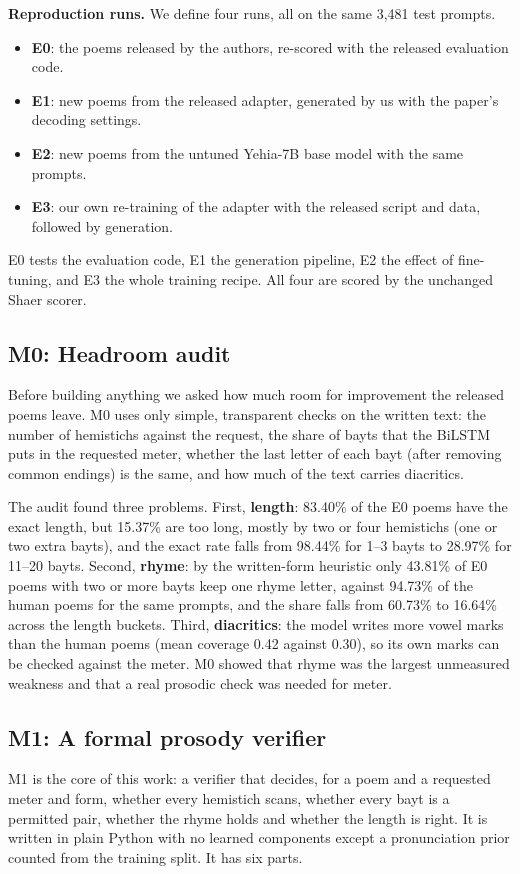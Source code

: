 \textbf{Reproduction runs.} We define four runs, all on the same 3,481 test prompts.
\begin{itemize}
\item \textbf{E0}: the poems released by the authors, re-scored with the released evaluation code.
\item \textbf{E1}: new poems from the released adapter, generated by us with the paper's decoding settings.
\item \textbf{E2}: new poems from the untuned Yehia-7B base model with the same prompts.
\item \textbf{E3}: our own re-training of the adapter with the released script and data, followed by generation.
\end{itemize}
E0 tests the evaluation code, E1 the generation pipeline, E2 the effect of fine-tuning, and E3 the whole training
recipe. All four are scored by the unchanged Shaer scorer.

\subsection{M0: Headroom audit}
\label{sec:m0}
Before building anything we asked how much room for improvement the released poems leave. M0 uses only simple,
transparent checks on the written text: the number of hemistichs against the request, the share of bayts that the
BiLSTM puts in the requested meter, whether the last letter of each bayt (after removing common endings) is the same,
and how much of the text carries diacritics.

The audit found three problems. First, \textbf{length}: 83.40\% of the E0 poems have the exact length, but 15.37\%
are too long, mostly by two or four hemistichs (one or two extra bayts), and the exact rate falls from 98.44\% for 1--3
bayts to 28.97\% for 11--20 bayts. Second, \textbf{rhyme}: by the written-form heuristic only 43.81\% of E0 poems
with two or more bayts keep one rhyme letter, against 94.73\% of the human poems for the same prompts, and the share
falls from 60.73\% to 16.64\% across the length buckets. Third, \textbf{diacritics}: the model writes more vowel marks
than the human poems (mean coverage 0.42 against 0.30), so its own marks can be checked against the meter. M0 showed
that rhyme was the largest unmeasured weakness and that a real prosodic check was needed for meter.

\subsection{M1: A formal prosody verifier}
\label{sec:m1}
M1 is the core of this work: a verifier that decides, for a poem and a requested meter and form, whether every
hemistich scans, whether every bayt is a permitted pair, whether the rhyme holds and whether the length is right. It
is written in plain Python with no learned components except a pronunciation prior counted from the training split.
It has six parts.

